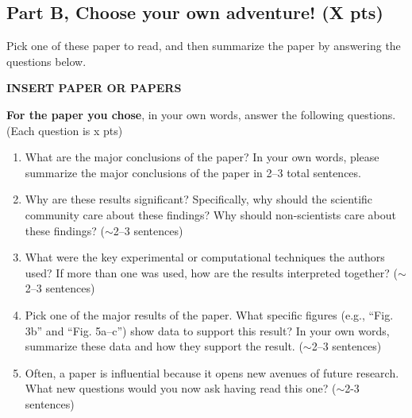 \documentclass{article}
\begin{document}
\newpage
\subsection*{Part B, Choose your own adventure!  (X pts)}

Pick one of these paper to read, and then summarize the paper by answering the questions below.

\textbf{INSERT PAPER OR PAPERS}


\textbf{For the paper you chose}, in your own words, answer the following questions. (Each question is x pts) %


\begin{enumerate}

\item What are the major conclusions of the paper? In your own words, please summarize the major conclusions of the paper in 2--3 total sentences.

\item Why are these results significant? Specifically,  why should the scientific community care about these findings? Why should non-scientists care about these findings? ($\sim$2--3 sentences)

\item What were the key experimental or computational techniques the authors used? If more than one was used, how are the results interpreted together? ($\sim$2--3 sentences)

\item Pick one of the major results of the paper. What specific figures (e.g., ``Fig. 3b'' and ``Fig. 5a--c'')  show data to support this result? 
In your own words, summarize these data and how they support the result.  ($\sim$2--3 sentences)

\item Often, a paper is influential because it opens new avenues of future research. What new questions would you now ask having read this one? ($\sim$2-3 sentences)

\end{enumerate}
\end{document}
